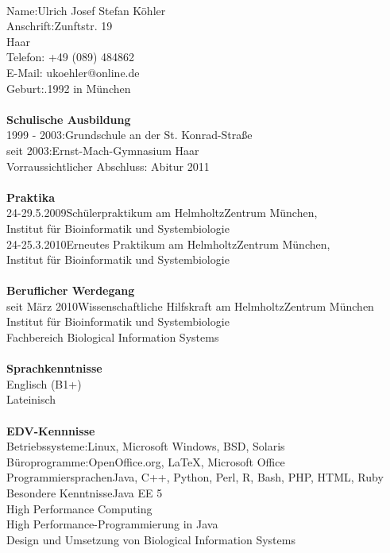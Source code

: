 \documentclass[a4paper,12pt,oneside]{scrbook}
\begin{document}
{\large\thispagestyle{empty}
\vspace*{-1cm}
\begin{tabbing}
\hspace*{5cm}\=\\
Name:\>Ulrich Josef Stefan Köhler\\
Anschrift:\>Zunftstr. 19\\
 Haar\\
\> Telefon: +49 (089) 484862\\
\> E-Mail: ukoehler@online.de\\
Geburt:.1992 in München\\\\
\hspace*{-4mm}\textbf{Schulische Ausbildung}\\
1999 - 2003:\>Grundschule an der St. Konrad-Straße\\
seit 2003:\>Ernst-Mach-Gymnasium Haar\\\>Vorraussichtlicher Abschluss: Abitur 2011\\\\
\hspace*{-4mm}\textbf{Praktika}\\
24-29.5.2009\>Schülerpraktikum am HelmholtzZentrum München,\\\>Institut für Bioinformatik und Systembiologie\\
24-25.3.2010\>Erneutes Praktikum am HelmholtzZentrum München,\\\> Institut für Bioinformatik und Systembiologie\\\\
\hspace*{-4mm}\textbf{Beruflicher Werdegang}\\
seit März 2010\>Wissenschaftliche Hilfskraft am HelmholtzZentrum München\\\>Institut für Bioinformatik und Systembiologie\\
\>Fachbereich Biological Information Systems\\\\
\hspace*{-4mm}\textbf{Sprachkenntnisse}\\
\>Englisch (B1+)\\
\>Lateinisch\\\\
\hspace*{-4mm}\textbf{EDV-Kennnisse}\\
Betriebssysteme:\>Linux, Microsoft Windows, BSD, Solaris\\
Büroprogramme:\>OpenOffice.org, \LaTeX, Microsoft Office\\
Programmiersprachen\>Java, C++, Python, Perl, R, Bash, PHP, HTML, Ruby\\
Besondere Kenntnisse\>Java EE 5\\\>High Performance Computing\\\>High Performance-Programmierung in Java\\\>Design und  Umsetzung von Biological Information Systems\\
\end{tabbing}
}
\end{document}
